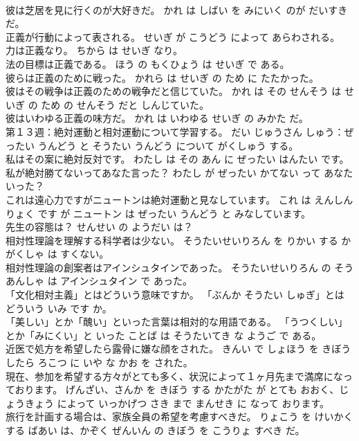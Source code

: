 \documentclass[8pt]{extreport}
\begin{document}
\begin{CJK}{UTF8}{min}
\\	彼は芝居を見に行くのが大好きだ。	かれ は しばい を みにいく のが だいすき だ。	
\\	正義が行動によって表される。	せいぎ が こうどう によって あらわされる。	
\\	力は正義なり。	ちから は せいぎ なり。	
\\	法の目標は正義である。	ほう の もくひょう は せいぎ で ある。	
\\	彼らは正義のために戦った。	かれら は せいぎ の ため に たたかった。	
\\	彼はその戦争は正義のための戦争だと信じていた。	かれ は その せんそう は せいぎ の ため の せんそう だと しんじていた。	
\\	彼はいわゆる正義の味方だ。	かれ は いわゆる せいぎ の みかた だ。	
\\	第１３週：絶対運動と相対運動について学習する。	だい じゅうさん しゅう：ぜったい うんどう と そうたい うんどう について がくしゅう する。	
\\	私はその案に絶対反対です。	わたし は その あん に ぜったい はんたい です。	
\\	私が絶対勝てないってあなた言った？	わたし が ぜったい かてない って あなた いった？	
\\	これは遠心力ですがニュートンは絶対運動と見なしています。	これ は えんしんりょく です が ニュートン は ぜったい うんどう と みなしています。	
\\	先生の容態は？	せんせい の ようだい は？	
\\	相対性理論を理解する科学者は少ない。	そうたいせいりろん を りかい する かがくしゃ は すくない。	
\\	相対性理論の創案者はアインシュタインであった。	そうたいせいりろん の そうあんしゃ は アインシュタイン で あった。	
\\	「文化相対主義」とはどういう意味ですか。	「ぶんか そうたい しゅぎ」とは どういう いみ です か。	
\\	「美しい」とか「醜い」といった言葉は相対的な用語である。	「うつくしい」とか「みにくい」と いった ことば は そうたいてき な ようご で ある。	
\\	近医で処方を希望したら露骨に嫌な顔をされた。	きんい で しょほう を きぼう したら ろこつ に いや な かお を された。	
\\	現在、参加を希望する方々がとても多く、状況によって１ヶ月先まで満席になっております。	げんざい、さんか を きぼう する かたがた が とても おおく、じょうきょう によって いっかげつ さき まで まんせき に なって おります。	
\\	旅行を計画する場合は、家族全員の希望を考慮すべきだ。	りょこう を けいかく する ばあい は、かぞく ぜんいん の きぼう を こうりょ すべき だ。	

\end{CJK}
\end{document}
